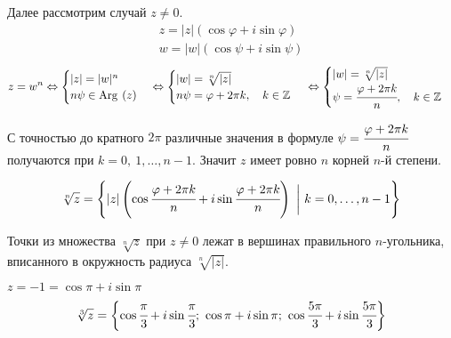 Далее рассмотрим случай $z \neq 0$. 
\begin{gather*}
z = |z|\left(\cos\varphi+i\sin\varphi\right)\\
w = |w|\left(\cos\psi+i\sin\psi\right)
\end{gather*}
\[
z = w^n \Leftrightarrow
\begin{cases}
|z| = |w|^n \\
n\psi\in\mathrm{Arg\:}\left(z\right)
\end{cases}
\Leftrightarrow
\begin{cases}
|w|= \sqrt[n]{|z|}\\
n\psi= \varphi+2\pi k,\quad k\in \mathbb Z
\end{cases}\\
\Leftrightarrow
\begin{cases}
|w|=\sqrt[n]{|z|}\\
\psi = \cfrac{\varphi+2\pi k}{n},\quad k \in \mathbb{Z}
\end{cases}
\]

С точностью до кратного $2\pi$ различные значения в формуле $\psi = \cfrac{\varphi+2\pi k }{n}$ получаются при $k = 0,\ 1,\ldots,n-1$. Значит $z$ имеет ровно $n$ корней $n$-й степени. 

\[ \sqrt[n]{z} = \Biggl\{|z|\left(\cos\cfrac{\varphi+2\pi k}{n}+i\sin\cfrac{\varphi+2\pi k }{n}\right)\ \biggl|\ k=0,\ldots,n-1\Biggr\}
\]

\begin{Comment}
Точки из множества $\sqrt[n]{z}$ при $z\neq 0$ лежат в вершинах правильного $n$-угольника, вписанного в окружность радиуса $\sqrt[n]{|z|}$. 
\end{Comment}

\begin{Examples} $z=-1=\cos\pi+i\sin\pi $
$$\sqrt[3]{z} = \biggl\{ \cos\cfrac\pi3+i\sin\cfrac\pi3;\ \cos\pi+i\sin\pi;\ \cos\cfrac{5\pi}{3}+i\sin\cfrac{5\pi}{3} \biggl\}
$$
\begin{center}
\end{center}

\end{Examples}

